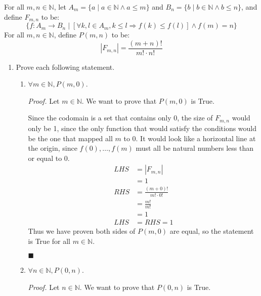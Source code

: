 \documentclass{article}
\newcommand\qedsymbol{\hfill$\blacksquare$}
\begin{document}
For all $m, n \in \mathbb{N}$, let $A_m = \{ a \mid a \in \mathbb{N} \land 
a \leq m \} $ and $B_n = \{ b \mid b \in \mathbb{N} \land b \leq n \}$, 
and define $F_{m, n }$ to be:
$$\{ f : A_m \rightarrow B_n \mid [ \forall k, l \in A_m, k \leq l 
\Rightarrow f ( k) \leq f (l) ] \land f (m) = n  \}$$
For all $m, n \in \mathbb{N}$, define $P (m, n)$ to be:
$$ | F_ {m, n} | = \frac{ (m + n)!}{m! \cdot n!}$$
\begin{enumerate}[label = (\alph*)]
    \item Prove each following statement.
        \begin{enumerate}[label = (\roman*)]
            \item $\forall m \in \mathbb{N}, P (m, 0)$. 

                \textit{Proof.} Let $m \in \mathbb{N}$. We want to prove 
                that $P (m, 0)$ is True. 

                Since the codomain is a set that contains only 0, the size 
                of $F_ {m, n}$ would only be 1, since the only function that 
                would satisfy the conditions would be the one that mapped 
                all $m$ to 0. It would look like a horizontal line at 
                the origin, since $f(0), \ldots, f(m)$ must all be 
                natural numbers less than 
                or equal to 0.
                \begin{align*}
                    LHS &= |F_ {m, n}|\\ 
                        &= 1 \\
                    RHS &= \frac{ (m + 0)!}{m! \cdot 0!} \\
                      &= \frac{m!}{m!} \\
                      &= 1 \\
                    LHS &= RHS = 1
                \end{align*}
                Thus we have proven both sides of $P (m, 0)$ are equal, 
                so the statement is True for all $m \in \mathbb{N}$. 
                
                \qedsymbol
            \item $\forall n \in \mathbb{N}, P (0, n)$. 

                \textit{Proof.} Let $n \in \mathbb{N}$. We want to prove 
                that $P(0, n)$ is True. 
                

\end{enumerate}
\end{enumerate}
\end{document}
